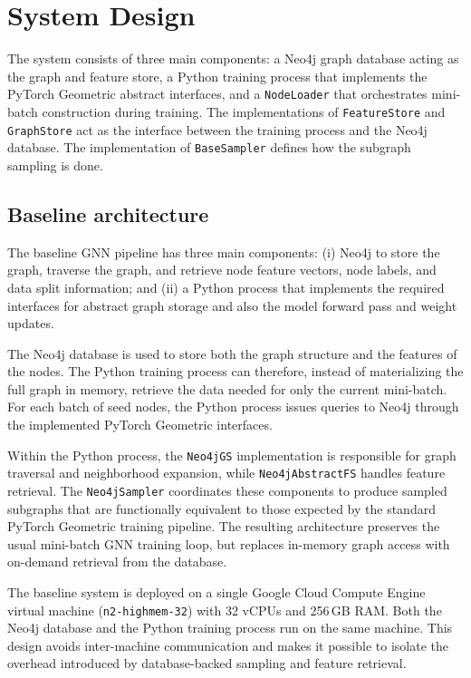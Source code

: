 \documentclass[PhD,single]{uclathes}
\begin{document}
\chapter{System Design}

The system consists of three main components: a Neo4j graph database acting as
the graph and feature store, a Python training process that implements the
PyTorch Geometric abstract interfaces, and a \texttt{NodeLoader} that
orchestrates mini-batch construction during training. The implementations of
\texttt{FeatureStore} and \texttt{GraphStore} act as the interface between the
training process and the Neo4j database. The implementation of
\texttt{BaseSampler} defines how the subgraph sampling is done.

\section{Baseline architecture}
The baseline GNN pipeline has three main components: (i) Neo4j to store the
graph, traverse the graph, and retrieve node feature vectors, node labels, and
data split information; and (ii) a Python process that implements the required
interfaces for abstract graph storage and also the model forward pass and
weight updates.

The Neo4j database is used to store both the graph structure and the features
of the nodes. The Python training process can therefore, instead of
materializing the full graph in memory, retrieve the data needed for only the
current mini-batch. For each batch of seed nodes, the Python process issues
queries to Neo4j through the implemented PyTorch Geometric interfaces.

Within the Python process, the \texttt{Neo4jGS} implementation is responsible
for graph traversal and neighborhood expansion, while \texttt{Neo4jAbstractFS}
handles feature retrieval. The \texttt{Neo4jSampler} coordinates these
components to produce sampled subgraphs that are functionally equivalent to
those expected by the standard PyTorch Geometric training pipeline. The
resulting architecture preserves the usual mini-batch GNN training loop, but
replaces in-memory graph access with on-demand retrieval from the database.

The baseline system is deployed on a single Google Cloud Compute Engine virtual
machine (\texttt{n2-highmem-32}) with 32 vCPUs and 256\,GB RAM. Both the Neo4j
database and the Python training process run on the same machine. This design
avoids inter-machine communication and makes it possible to isolate the
overhead introduced by database-backed sampling and feature retrieval.
\end{document}
